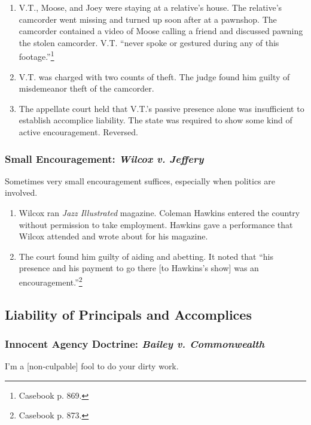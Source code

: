 \begin{enumerate}
    \item V.T., Moose, and Joey were staying at a relative's house. The 
    relative's camcorder went missing and turned up soon after at a pawnshop. 
    The camcorder contained a video of Moose calling a friend and discussed 
    pawning the stolen camcorder. V.T. ``never spoke or gestured during any of 
    this footage.''\footnote{Casebook p. 869.}
    \item V.T. was charged with two counts of theft. The judge found him 
    guilty of misdemeanor theft of the camcorder.
    \item The appellate court held that V.T.'s passive presence alone was insufficient 
    to establish accomplice liability. The state was required to show some 
    kind of active encouragement. Reversed.
\end{enumerate}

\subsubsection{Small Encouragement: \emph{Wilcox v. Jeffery}}

Sometimes very small encouragement suffices, especially when politics are 
involved.

\begin{enumerate}
    \item Wilcox ran \emph{Jazz Illustrated} magazine. Coleman Hawkins entered 
    the country without permission to take employment. Hawkins gave a 
    performance that Wilcox attended and wrote about for his magazine.
    \item The court found him guilty of aiding and abetting. It noted that 
    ``his presence and his payment to go there [to Hawkins's show] was an 
    encouragement.''\footnote{Casebook p. 873.}
\end{enumerate}

\subsection{Liability of Principals and Accomplices}

\subsubsection{Innocent Agency Doctrine: \emph{Bailey v. Commonwealth}}

I'm a [non-culpable] fool to do your dirty work.

